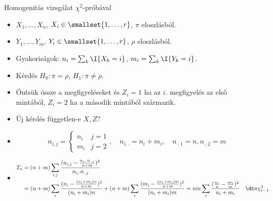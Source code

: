 \documentclass[aspectratio=169,notheorems,9pt,\option]{beamer}
\begin{document}
\begin{frame}{Homogenitás vizsgálat $\chi^2$-próbával}
  \begin{itemize}
    \item $X_1,\dots,X_n$, $X_i\in\smallset{1,\dots,r}$, $\pi$
    eloszlásból.
    \item $Y_1,\dots,Y_m$, $Y_i\in\smallset{1,\dots,r}$, $\rho$
    eloszlásból.
    
    \item Gyakoriságok: $n_i=\sum_k\I{X_k=i}$, $m_i=\sum_k\I{Y_k=i}$.
    \item Kérdés $H_0:\pi=\rho$, $H_1:\pi\neq\rho$.
    \item Öntsük össze a megfigyeléseket és $Z_i=1$ ha az
    $i$. megfigyelés az első mintából, $Z_i=2$ ha a második mintából
    származik.
    \item Új kérdés független-e $X,Z$?
    
    \item
    \begin{displaymath}
      n_{i,j}=
      \begin{cases}
        n_i&j=1\\m_i&j=2
      \end{cases},
      \quad
      n_{i,\cdot}=n_i+m_i,\quad
      n_{\cdot,1}=n,n_{\cdot,2}=m
    \end{displaymath}
    \item
    \begin{align*}
      T_n&=(n+m)\sum_{i,j}\frac{(n_{i,j}-\frac{n_{i,\cdot}n_{\cdot,j}}{n+m})^2}{n_{i,\cdot}n_{\cdot,j}}\\
      &= (n+m)
      \sum_{i}\frac{(n_{i}-\frac{(n_i+m_i)n}{n+m})^2}{(n_i+m_i)n}+%
      (n+m)
      \sum_{i}\frac{(m_{i}-\frac{(n_i+m_i)m}{n+m})^2}{(n_i+m_i)m}
      =nm\sum_{i}\frac{(\frac{n_{i}}n-\frac{m_i}m)^2}{n_i+m_i}\quad\dto\chi^2_{r-1}
    \end{align*}
    
  \end{itemize}
\end{frame}
\end{document}
